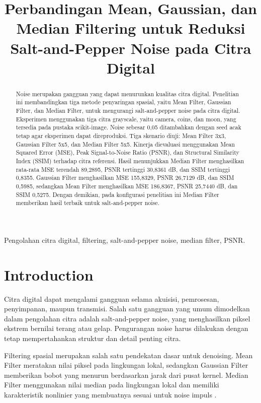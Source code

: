 \documentclass[conference,a4paper]{IEEEtran}
\title{Perbandingan Mean, Gaussian, dan Median Filtering untuk Reduksi Salt-and-Pepper Noise pada Citra Digital}
\author{\IEEEauthorblockN{Ahmad Furqon Ramadhani}\IEEEauthorblockA{Program Studi Teknik Informatika\\Universitas Darussalam Gontor\\NIM: 452024611066\\Email: afurqonramadhani24@student.cs.unida.gontor.ac.id}}
\begin{document}
\maketitle
\begin{abstract}
Noise merupakan gangguan yang dapat menurunkan kualitas citra digital. Penelitian ini membandingkan tiga metode penyaringan spasial, yaitu Mean Filter, Gaussian Filter, dan Median Filter, untuk mengurangi salt-and-pepper noise pada citra digital. Eksperimen menggunakan tiga citra grayscale, yaitu camera, coins, dan moon, yang tersedia pada pustaka scikit-image. Noise sebesar 0,05 ditambahkan dengan seed acak tetap agar eksperimen dapat direproduksi. Tiga skenario diuji: Mean Filter 3x3, Gaussian Filter 5x5, dan Median Filter 5x5. Kinerja dievaluasi menggunakan Mean Squared Error (MSE), Peak Signal-to-Noise Ratio (PSNR), dan Structural Similarity Index (SSIM) terhadap citra referensi. Hasil menunjukkan Median Filter menghasilkan rata-rata MSE terendah 89,2895, PSNR tertinggi 30,8361 dB, dan SSIM tertinggi 0,8355. Gaussian Filter menghasilkan MSE 155,8329, PSNR 26,7129 dB, dan SSIM 0,5985, sedangkan Mean Filter menghasilkan MSE 186,8367, PSNR 25,7440 dB, dan SSIM 0,5275. Dengan demikian, pada konfigurasi penelitian ini Median Filter memberikan hasil terbaik untuk salt-and-pepper noise.
\end{abstract}
\begin{IEEEkeywords}
Pengolahan citra digital, filtering, salt-and-pepper noise, median filter, PSNR.
\end{IEEEkeywords}

\section{Introduction}
Citra digital dapat mengalami gangguan selama akuisisi, pemrosesan, penyimpanan, maupun transmisi. Salah satu gangguan yang umum dimodelkan dalam pengolahan citra adalah salt-and-pepper noise, yang menghasilkan piksel ekstrem bernilai terang atau gelap. Pengurangan noise harus dilakukan dengan tetap mempertahankan struktur dan detail penting citra.

Filtering spasial merupakan salah satu pendekatan dasar untuk denoising. Mean Filter meratakan nilai piksel pada lingkungan lokal, sedangkan Gaussian Filter memberikan bobot yang menurun berdasarkan jarak dari pusat kernel. Median Filter menggunakan nilai median pada lingkungan lokal dan memiliki karakteristik nonlinier yang membuatnya sesuai untuk noise impuls \cite{huang1979,perreault2007}.
\end{document}
